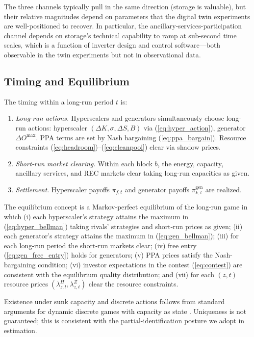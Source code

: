 \documentclass[12pt,letterpaper]{article}
\begin{document}
The three channels typically pull in the same direction (storage is
valuable), but their relative magnitudes depend on parameters that the
digital twin experiments are well-positioned to recover. In particular,
the ancillary-services-participation channel depends on storage's
technical capability to ramp at sub-second time scales, which is a
function of inverter design and control software---both observable in the
twin experiments but not in observational data.

\subsection{Timing and Equilibrium}
\label{sec:timing}

The timing within a long-run period $t$ is:
\begin{enumerate}[leftmargin=*,label=\textbf{(\alph*)}]
    \item \emph{Long-run actions.} Hyperscalers and generators simultaneously
    choose long-run actions: hyperscaler $(\Delta K, \sigma, \Delta S, B)$
    via (\ref{eq:hyper_action}), generator $\Delta O^{\max}$. PPA terms are
    set by Nash bargaining (\ref{eq:ppa_bargain}). Resource constraints
    (\ref{eq:headroom})--(\ref{eq:cleanpool}) clear via shadow prices.
    \item \emph{Short-run market clearing.} Within each block $b$, the
    energy, capacity, ancillary services, and REC markets clear taking
    long-run capacities as given.
    \item \emph{Settlement.} Hyperscaler payoffs $\pi_{f,t}$ and generator
    payoffs $\pi^{\text{gen}}_{k,t}$ are realized.
\end{enumerate}

The equilibrium concept is a Markov-perfect equilibrium of the long-run
game in which (i) each hyperscaler's strategy attains the maximum in
(\ref{eq:hyper_bellman}) taking rivals' strategies and short-run prices as
given; (ii) each generator's strategy attains the maximum in
(\ref{eq:gen_bellman}); (iii) for each long-run period the short-run
markets clear; (iv) free entry (\ref{eq:gen_free_entry}) holds for generators;
(v) PPA prices satisfy the Nash-bargaining condition; (vi) investor
expectations in the contest (\ref{eq:contest}) are consistent with the
equilibrium quality distribution; and (vii) for each $(z,t)$ resource
prices $(\lambda^H_{z,t}, \lambda^Z_{z,t})$ clear the resource constraints.

Existence under sunk capacity and discrete actions follows from standard
arguments for dynamic discrete games with capacity as state
\citep{gowrisankaran2012capacity}. Uniqueness is not guaranteed; this is
consistent with the partial-identification posture we adopt in estimation.
\end{document}

